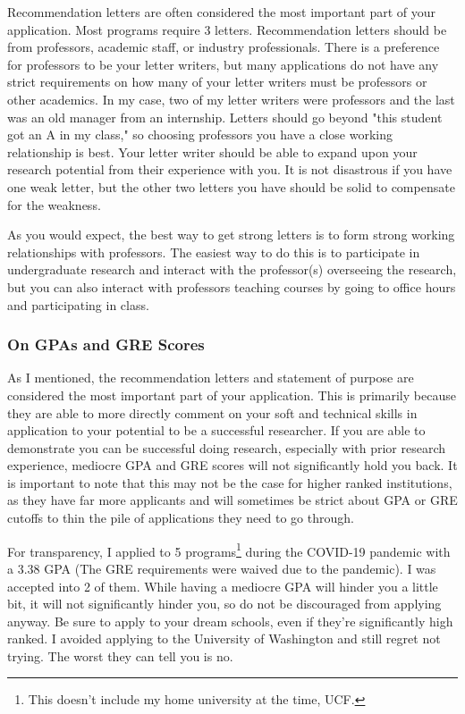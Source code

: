 \documentclass[12pt]{article}
\begin{document}
Recommendation letters are often considered the most important part of your application. Most programs require 3 letters. Recommendation letters should be from professors, academic staff, or industry professionals. There is a preference for professors to be your letter writers, but many applications do not have any strict requirements on how many of your letter writers must be professors or other academics. In my case, two of my letter writers were professors and the last was an old manager from an internship. Letters should go beyond "this student got an A in my class," so choosing professors you have a close working relationship is best. Your letter writer should be able to expand upon your research potential from their experience with you. It is not disastrous if you have one weak letter, but the other two letters you have should be solid to compensate for the weakness.

As you would expect, the best way to get strong letters is to form strong working relationships with professors. The easiest way to do this is to participate in undergraduate research and interact with the professor(s) overseeing the research, but you can also interact with professors teaching courses by going to office hours and participating in class.

\subsubsection{On GPAs and GRE Scores}

As I mentioned, the recommendation letters and statement of purpose are considered the most important part of your application. This is primarily because they are able to more directly comment on your soft and technical skills in application to your potential to be a successful researcher. If you are able to demonstrate you can be successful doing research, especially with prior research experience, mediocre GPA and GRE scores will not significantly hold you back. It is important to note that this may not be the case for higher ranked institutions, as they have far more applicants and will sometimes be strict about GPA or GRE cutoffs to thin the pile of applications they need to go through. 

For transparency, I applied to 5 programs\footnote{This doesn't include my home university at the time, UCF.} during the COVID-19 pandemic with a 3.38 GPA (The GRE requirements were waived due to the pandemic). I was accepted into 2 of them. While having a mediocre GPA will hinder you a little bit, it will not significantly hinder you, so do not be discouraged from applying anyway. Be sure to apply to your dream schools, even if they're significantly high ranked. I avoided applying to the University of Washington and still regret not trying. The worst they can tell you is no.
\end{document}
